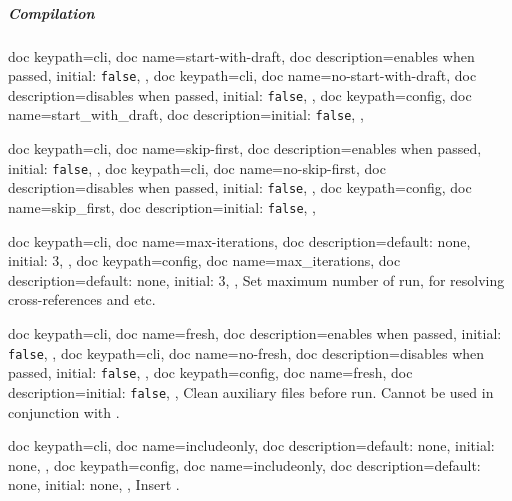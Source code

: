 \documentclass[a4paper, 11pt]{scrartcl}
\begin{document}
\subparagraph{Compilation}
\begin{docKeys}[
	]{
		{
			doc keypath=cli,
			doc name=start-with-draft,
			doc description={enables when passed, initial: \texttt{false}},
		},
		{
			doc keypath=cli,
			doc name=no-start-with-draft,
			doc description={disables when passed, initial: \texttt{false}},
		},
		{
			doc keypath=config,
			doc name=start_with_draft,
			doc description={initial: \texttt{false}},
		},
	}
	\Todo{}
\end{docKeys}
\begin{docKeys}[
	]{
		{
			doc keypath=cli,
			doc name=skip-first,
			doc description={enables when passed, initial: \texttt{false}},
		},
		{
			doc keypath=cli,
			doc name=no-skip-first,
			doc description={disables when passed, initial: \texttt{false}},
		},
		{
			doc keypath=config,
			doc name=skip_first,
			doc description={initial: \texttt{false}},
		},
	}
	\Todo{}
\end{docKeys}
\begin{docKeys}[
		doc parameter={=\meta{max\_iterations}},
	]{
		{
			doc keypath=cli,
			doc name=max-iterations,
			doc description={default: none, initial: 3},
		},
		{
			doc keypath=config,
			doc name=max_iterations,
			doc description={default: none, initial: 3},
		},
	}
	Set maximum number of run, for resolving cross-references and etc.
\end{docKeys}
\begin{docKeys}[
	]{
		{
			doc keypath=cli,
			doc name=fresh,
			doc description={enables when passed, initial: \texttt{false}},
		},
		{
			doc keypath=cli,
			doc name=no-fresh,
			doc description={disables when passed, initial: \texttt{false}},
		},
		{
			doc keypath=config,
			doc name=fresh,
			doc description={initial: \texttt{false}},
		},
	}
	Clean auxiliary files before run.
	Cannot be used in conjunction with .
\end{docKeys}
\begin{docKeys}[
		doc parameter={=\meta{includeonly}},
	]{
		{
			doc keypath=cli,
			doc name=includeonly,
			doc description={default: none, initial: none},
		},
		{
			doc keypath=config,
			doc name=includeonly,
			doc description={default: none, initial: none},
		},
	}
	Insert .
\end{docKeys}
\end{document}
